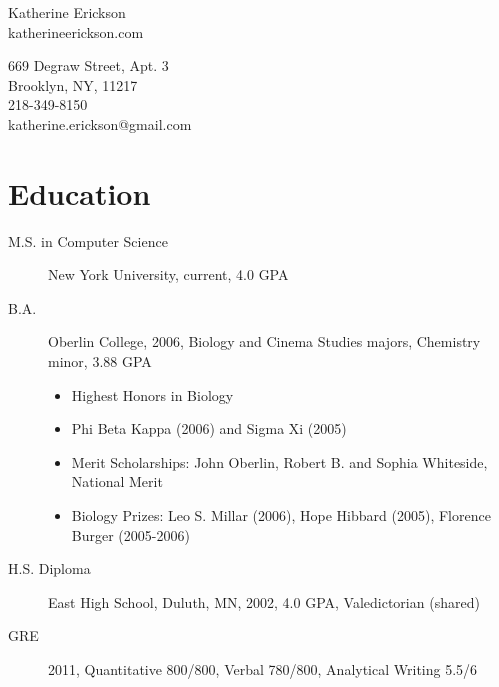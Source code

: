 \documentclass{article}
\date{\today}
\makeatletter
\newcommand{\name}{Katherine Erickson}
\newcommand{\address}{669 Degraw Street, Apt. 3\\Brooklyn, NY, 11217}
\newcommand{\phone}{218-349-8150}
\newcommand{\email}{katherine.erickson@gmail.com}
\newcommand{\website}{katherineerickson.com}
\newcommand{\header}{
	\begin{minipage}[t]{.5\textwidth}
		\Huge
			\name
		\normalsize
			\vspace{1em}\\
			\website \\

	\end{minipage}
	\begin{minipage}[t]{.5\textwidth}
		\vspace{-1.6em}
		\begin{flushright}
			\footnotesize
				\address \\
				\phone \\
				\email \\
			\normalsize
		\end{flushright}
	\end{minipage}
}
\makeatother
\begin{document}
	\header

	\section*{Education}
	\begin{description}
		\item[M.S. in Computer Science] New York University, current, 4.0 GPA
		\item[B.A.] Oberlin College, 2006, Biology and Cinema Studies majors, Chemistry minor, 3.88 GPA
		\footnotesize
		\begin{itemize}
			\item Highest Honors in Biology
			\item Phi Beta Kappa (2006) and Sigma Xi (2005)
			\item Merit Scholarships: John Oberlin, Robert B. and Sophia Whiteside, National Merit 
			\item Biology Prizes: Leo S. Millar (2006), Hope Hibbard (2005), Florence Burger (2005-2006)
		\end{itemize}
		\normalsize
		\item[H.S. Diploma] East High School, Duluth, MN, 2002, 4.0 GPA, Valedictorian (shared)
		\item[GRE] 2011, Quantitative 800/800, Verbal 780/800, Analytical Writing 5.5/6
	\end{description}
    
\end{document}
